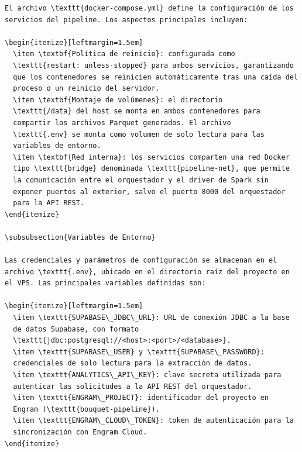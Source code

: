 \begin{verbatim}
El archivo \texttt{docker-compose.yml} define la configuración de los
servicios del pipeline. Los aspectos principales incluyen:

\begin{itemize}[leftmargin=1.5em]
  \item \textbf{Política de reinicio}: configurada como
  \texttt{restart: unless-stopped} para ambos servicios, garantizando
  que los contenedores se reinicien automáticamente tras una caída del
  proceso o un reinicio del servidor.
  \item \textbf{Montaje de volúmenes}: el directorio
  \texttt{/data} del host se monta en ambos contenedores para
  compartir los archivos Parquet generados. El archivo
  \texttt{.env} se monta como volumen de solo lectura para las
  variables de entorno.
  \item \textbf{Red interna}: los servicios comparten una red Docker
  tipo \texttt{bridge} denominada \texttt{pipeline-net}, que permite
  la comunicación entre el orquestador y el driver de Spark sin
  exponer puertos al exterior, salvo el puerto 8000 del orquestador
  para la API REST.
\end{itemize}

\subsubsection{Variables de Entorno}

Las credenciales y parámetros de configuración se almacenan en el
archivo \texttt{.env}, ubicado en el directorio raíz del proyecto en
el VPS. Las principales variables definidas son:

\begin{itemize}[leftmargin=1.5em]
  \item \texttt{SUPABASE\_JDBC\_URL}: URL de conexión JDBC a la base
  de datos Supabase, con formato
  \texttt{jdbc:postgresql://<host>:<port>/<database>}.
  \item \texttt{SUPABASE\_USER} y \texttt{SUPABASE\_PASSWORD}:
  credenciales de solo lectura para la extracción de datos.
  \item \texttt{ANALYTICS\_API\_KEY}: clave secreta utilizada para
  autenticar las solicitudes a la API REST del orquestador.
  \item \texttt{ENGRAM\_PROJECT}: identificador del proyecto en
  Engram (\texttt{bouquet-pipeline}).
  \item \texttt{ENGRAM\_CLOUD\_TOKEN}: token de autenticación para la
  sincronización con Engram Cloud.
\end{itemize}


\end{verbatim}
